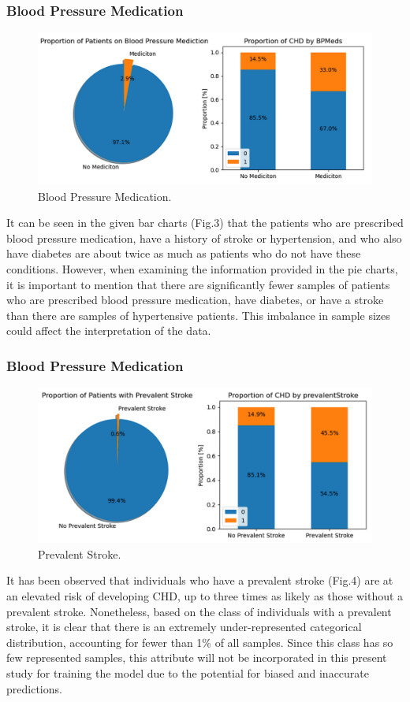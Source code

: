 \documentclass[conference]{IEEEtran}
\begin{document}
\subsubsection{Blood Pressure Medication}

\begin{figure}[H]
    \centerline{\includegraphics[width=0.7\linewidth]{fig3.png}}
    \caption{Blood Pressure Medication.}
    \label{fig3}
\end{figure}

It can be seen in the given bar charts (Fig.3) that the patients who are prescribed blood pressure medication, have a history of stroke or hypertension, and who also have diabetes are about twice as much as patients who do not have these conditions. However, when examining the information provided in the pie charts, it is important to mention that there are significantly fewer samples of patients who are prescribed blood pressure medication, have diabetes, or have a stroke than there are samples of hypertensive patients. This imbalance in sample sizes could affect the interpretation of the data.

\subsubsection{Blood Pressure Medication}

\begin{figure}[H]
    \centerline{\includegraphics[width=0.7\linewidth]{fig4.png}}
    \caption{Prevalent Stroke.}
    \label{fig4}
\end{figure}

It has been observed that individuals who have a prevalent stroke (Fig.4) are at an elevated risk of developing CHD, up to three times as likely as those without a prevalent stroke. Nonetheless, based on the class of individuals with a prevalent stroke, it is clear that there is an extremely under-represented categorical distribution, accounting for fewer than 1\% of all samples. Since this class has so few represented samples, this attribute will not be incorporated in this present study for training the model due to the potential for biased and inaccurate predictions.
\end{document}
